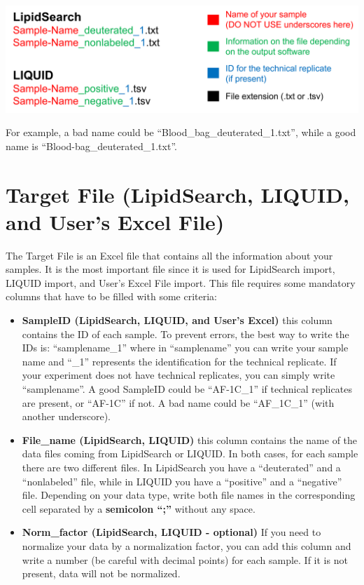 \documentclass[
]{book}
\providecommand{\tightlist}{%
  \setlength{\itemsep}{0pt}\setlength{\parskip}{0pt}}
\begin{document}
\includegraphics[width=1\linewidth]{images/notation_files}

For example, a bad name could be ``Blood\_bag\_deuterated\_1.txt'', while a good name is ``Blood-bag\_deuterated\_1.txt''.

\hypertarget{sec22}{%
\section{Target File (LipidSearch, LIQUID, and User's Excel File)}\label{sec22}}

The Target File is an Excel file that contains all the information about your samples. It is the most important file since it is used for LipidSearch import, LIQUID import, and User's Excel File import. This file requires some mandatory columns that have to be filled with some criteria:

\begin{itemize}
\tightlist
\item
  \textbf{SampleID (LipidSearch, LIQUID, and User's Excel)} this column contains the ID of each sample. To prevent errors, the best way to write the IDs is: ``samplename\_1'' where in ``samplename'' you can write your sample name and ``\_1'' represents the identification for the technical replicate. If your experiment does not have technical replicates, you can simply write ``samplename''. A good SampleID could be ``AF-1C\_1'' if technical replicates are present, or ``AF-1C'' if not. A bad name could be ``AF\_1C\_1'' (with another underscore).
\item
  \textbf{File\_name (LipidSearch, LIQUID)} this column contains the name of the data files coming from LipidSearch or LIQUID. In both cases, for each sample there are two different files. In LipidSearch you have a ``deuterated'' and a ``nonlabeled'' file, while in LIQUID you have a ``positive'' and a ``negative'' file. Depending on your data type, write both file names in the corresponding cell separated by a \textbf{semicolon ``;''} without any space.
\item
  \textbf{Norm\_factor (LipidSearch, LIQUID - optional)} If you need to normalize your data by a normalization factor, you can add this column and write a number (be careful with decimal points) for each sample. If it is not present, data will not be normalized.
\end{itemize}
\end{document}
